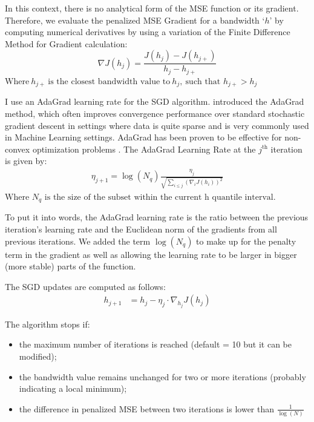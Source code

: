 \documentclass[12pt]{article}
\theoremstyle{plain}
\theoremstyle{remark}
\begin{document}
In this context, there is no analytical form of the MSE function or its gradient. Therefore, we evaluate the penalized MSE Gradient for a bandwidth ‘$h$’ by computing numerical derivatives by using a variation of the Finite Difference Method for Gradient calculation: 
\[\nabla J(h_j) = \frac{J(h_j) - J(h_{j+}) }{h_j - h_{j+}}\]
$\text{Where}\ h_{j+}\ \text{is the closest bandwidth value to}\  h_j,\ \text{such that } h_{j+}>h_j$

I use an AdaGrad learning rate for the SGD algorithm. \cite{duchi2011adaptive} introduced the AdaGrad method, which often improves convergence performance over standard stochastic gradient descent in settings where data is quite sparse and is very commonly used in Machine Learning settings. AdaGrad has been proven to be effective for non-convex optimization problems \parencite{defossez2020simple}.
The AdaGrad Learning Rate at the $j^{\text{th}}$ iteration is given by:
\begin{align*}
    \eta_{j+1} = \log(N_{q})\frac{\eta_j} {\sqrt{\sum_{i \leq j} \left(\nabla_i J(h_i)\right)^2} }
\end{align*}
$\text{Where } N_q \text{ is the size of the subset within the current h quantile interval}.$

To put it into words, the AdaGrad learning rate is the ratio between the previous iteration's learning rate and the Euclidean norm of the gradients from all previous iterations. We added the term $\log(N_q)$ to make up for the penalty term in the gradient as well as allowing the learning rate to be larger in bigger (more stable) parts of the function. 

The SGD updates are computed as follows:
\begin{align*}
    h_{j+1} &= h_j - \eta_j \cdot \nabla_{h_j} J(h_j) 
\end{align*}

The algorithm stops if:
\begin{itemize}
    \item the maximum number of iterations is reached (default = 10 but it can be modified);
    \item the bandwidth value remains unchanged for two or more iterations (probably indicating a local minimum);
    \item the difference in penalized MSE between two iterations is lower than $\frac{1}{\log(N)}$
\end{itemize}
\end{document}
